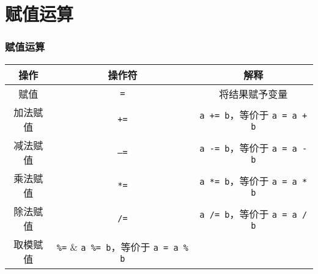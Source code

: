 \section{赋值运算}

\begin{frame}[fragile]
    \frametitle{赋值运算}

    \begin{table}[]
        \begin{tabular}{ccc}
            \toprule
            操作     & 操作符         & 解释                                             \\
            \midrule
            赋值     & \lstinline|=|  & 将结果赋予变量                                   \\
            加法赋值 & \lstinline|+=| & \lstinline|a += b|，等价于 \lstinline|a = a + b| \\
            减法赋值 & \lstinline|–=| & \lstinline|a -= b|，等价于 \lstinline|a = a - b| \\
            乘法赋值 & \lstinline|*=| & \lstinline|a *= b|，等价于 \lstinline|a = a * b| \\
            除法赋值 & \lstinline|/=| & \lstinline|a /= b|，等价于 \lstinline|a = a / b| \\
            取模赋值 & \lstinline|%=| & \lstinline|a %= b|，等价于 \lstinline|a = a % b| \\
            \bottomrule
        \end{tabular}
    \end{table}
\end{frame}

